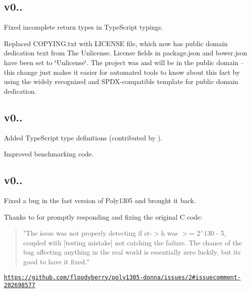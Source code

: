 \subsection*{v0.. }


\begin{DoxyItemize}
\item Fixed incomplete return types in Type\+Script typings.
\item Replaced C\+O\+P\+Y\+I\+N\+G.\+txt with L\+I\+C\+E\+N\+SE file, which now has public domain dedication text from The Unlicense. License fields in package.\+json and bower.\+json have been set to \char`\"{}\+Unlicense\char`\"{}. The project was and will be in the public domain -- this change just makes it easier for automated tools to know about this fact by using the widely recognized and S\+P\+D\+X-\/compatible template for public domain dedication.
\end{DoxyItemize}

\subsection*{v0.. }


\begin{DoxyItemize}
\item Added Type\+Script type definitions (contributed by ).
\item Improved benchmarking code.
\end{DoxyItemize}

\subsection*{v0.. }

Fixed a bug in the fast version of Poly1305 and brought it back.

Thanks to  for promptly responding and fixing the original C code\+:

\begin{quote}
"The issue was not properly detecting if st-\/$>$h was $>$= 2$^\wedge$130 -\/ 5, coupled with \mbox{[}testing mistake\mbox{]} not catching the failure. The chance of the bug affecting anything in the real world is essentially zero luckily, but it\textquotesingle{}s good to have it fixed." \end{quote}


\href{https://github.com/floodyberry/poly1305-donna/issues/2#issuecomment-202698577}{\tt https\+://github.\+com/floodyberry/poly1305-\/donna/issues/2\#issuecomment-\/202698577}


